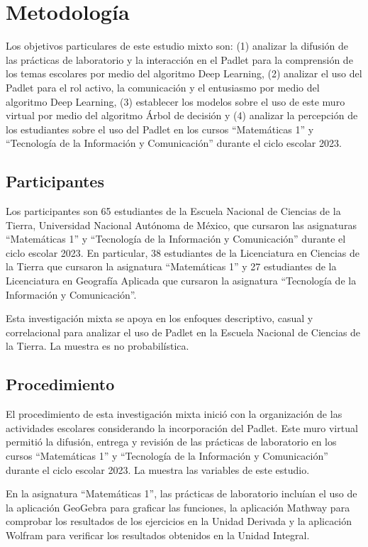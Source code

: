 \documentclass[spanish]{textolivre}
\begin{document}
\section{Metodología}\label{sec-conduta}
Los objetivos particulares de este estudio mixto son: (1) analizar la difusión de las prácticas de laboratorio y la interacción en el Padlet para la comprensión de los temas escolares por medio del algoritmo Deep Learning, (2) analizar el uso del Padlet para el rol activo, la comunicación y el entusiasmo por medio del algoritmo Deep Learning, (3) establecer los modelos sobre el uso de este muro virtual por medio del algoritmo Árbol de decisión y (4) analizar la percepción de los estudiantes sobre el uso del Padlet en los cursos “Matemáticas 1” y “Tecnología de la Información y Comunicación” durante el ciclo escolar 2023.


\subsection{Participantes}\label{sec-fmt-manuscrito}
Los participantes son 65 estudiantes de la Escuela Nacional de Ciencias de la Tierra, Universidad Nacional Autónoma de México, que cursaron las asignaturas “Matemáticas 1” y “Tecnología de la Información y Comunicación” durante el ciclo escolar 2023.  En particular, 38 estudiantes de la Licenciatura en Ciencias de la Tierra que cursaron la asignatura “Matemáticas 1” y 27 estudiantes de la Licenciatura en Geografía Aplicada que cursaron la asignatura “Tecnología de la Información y Comunicación”.

Esta investigación mixta se apoya en los enfoques descriptivo, casual y correlacional para analizar el uso de Padlet en la Escuela Nacional de Ciencias de la Tierra. La muestra es no probabilística.


\subsection{Procedimiento}\label{sec-formato}
El procedimiento de esta investigación mixta inició con la organización de las actividades escolares considerando la incorporación del Padlet. Este muro virtual permitió la difusión, entrega y revisión de las prácticas de laboratorio en los cursos “Matemáticas 1” y “Tecnología de la Información y Comunicación” durante el ciclo escolar 2023. La  muestra las variables de este estudio.

En la asignatura “Matemáticas 1”, las prácticas de laboratorio incluían el uso de la aplicación GeoGebra para graficar las funciones, la aplicación Mathway para comprobar los resultados de los ejercicios en la Unidad Derivada y la aplicación Wolfram para verificar los resultados obtenidos en la Unidad Integral.
\end{document}
